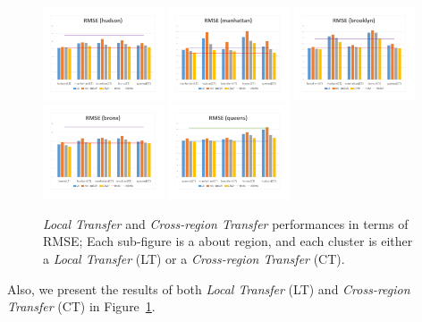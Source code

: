 \documentclass[letterpaper]{article} %
\begin{document}
\begin{figure}[th!]
	\centering
	\includegraphics[width=0.32\textwidth]{figures/1.pdf}
	\includegraphics[width=0.32\textwidth]{figures/2.pdf}
	\includegraphics[width=0.32\textwidth]{figures/3.pdf}
	\includegraphics[width=0.32\textwidth]{figures/4.pdf}
	\includegraphics[width=0.32\textwidth]{figures/5.pdf}
	\caption{\textit{Local Transfer} and \textit{Cross-region Transfer} performances in terms of RMSE; Each sub-figure is a about region, and each cluster is either a \textit{Local Transfer} (LT) or a \textit{Cross-region Transfer} (CT).}
	\label{fig:transfer}
\end{figure}
Also, we present the results of both \textit{Local Transfer} (LT) and \textit{Cross-region Transfer} (CT) in Figure~\ref{fig:transfer}.
\end{document}
